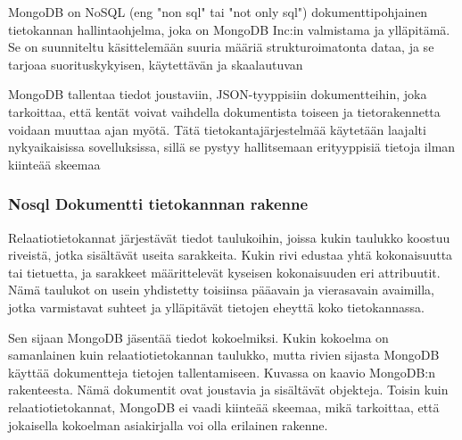 












MongoDB on NoSQL (eng "non sql"{} tai "not only sql"{}) dokumenttipohjainen tietokannan hallintaohjelma,
joka on MongoDB Inc:in valmistama ja ylläpitämä.
Se on suunniteltu käsittelemään suuria määriä strukturoimatonta dataa,
ja se tarjoaa suorituskykyisen, käytettävän ja skaalautuvan
\medskip




MongoDB tallentaa tiedot joustaviin, JSON-tyyppisiin dokumentteihin, 
joka tarkoittaa, että kentät voivat vaihdella dokumentista toiseen ja tietorakennetta voidaan muuttaa ajan myötä. 
Tätä tietokantajärjestelmää käytetään laajalti nykyaikaisissa sovelluksissa, 
sillä se pystyy hallitsemaan erityyppisiä tietoja ilman kiinteää skeemaa
\medskip



\subsubsection{Nosql Dokumentti tietokannnan rakenne}




Relaatiotietokannat järjestävät tiedot taulukoihin,
joissa kukin taulukko koostuu riveistä, jotka sisältävät useita sarakkeita.
Kukin rivi edustaa yhtä kokonaisuutta tai tietuetta, ja sarakkeet määrittelevät kyseisen kokonaisuuden eri attribuutit.
Nämä taulukot on usein yhdistetty toisiinsa pääavain ja vierasavain avaimilla,
jotka varmistavat suhteet ja ylläpitävät tietojen eheyttä koko tietokannassa.
\medskip

Sen sijaan MongoDB jäsentää tiedot kokoelmiksi.
Kukin kokoelma on samanlainen kuin relaatiotietokannan taulukko,
mutta rivien sijasta MongoDB käyttää dokumentteja tietojen tallentamiseen.
Kuvassa \nextImageCount{} on kaavio MongoDB:n rakenteesta. 
Nämä dokumentit ovat joustavia ja sisältävät objekteja.
Toisin kuin relaatiotietokannat, MongoDB ei vaadi kiinteää skeemaa, mikä tarkoittaa, 
että jokaisella kokoelman asiakirjalla voi olla erilainen rakenne.
\medskip

